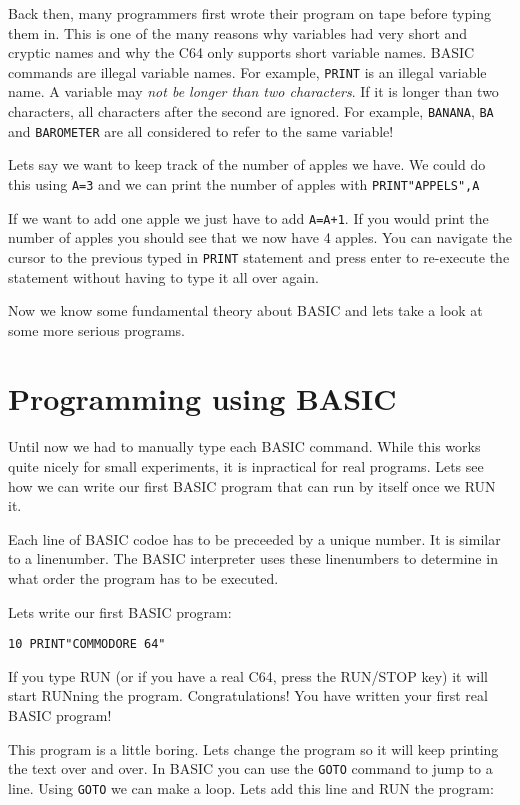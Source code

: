 \documentclass{article}
\begin{document}
Back then, many programmers first wrote their program on tape before typing them in.
This is one of the many reasons why variables had very short and cryptic names and why the C64 only supports short variable names.
BASIC commands are illegal variable names. For example, \verb:PRINT: is an illegal variable name.
A variable may \emph{not be longer than two characters}.
If it is longer than two characters, all characters after the second are ignored.
For example, \verb:BANANA:, \verb:BA: and \verb:BAROMETER: are all considered to refer to the same variable!

Lets say we want to keep track of the number of apples we have.
We could do this using \verb:A=3: and we can print the number of apples with \verb:PRINT"APPELS",A:

If we want to add one apple we just have to add \verb:A=A+1:.
If you would print the number of apples you should see that we now have 4 apples.
You can navigate the cursor to the previous typed in \verb:PRINT: statement and press enter to re-execute the statement without having to type it all over again.

Now we know some fundamental theory about BASIC and lets take a look at some more serious programs.

\section{Programming using BASIC}

Until now we had to manually type each BASIC command.
While this works quite nicely for small experiments, it is inpractical for real programs.
Lets see how we can write our first BASIC program that can run by itself once we RUN it.

Each line of BASIC codoe has to be preceeded by a unique number.
It is similar to a linenumber.
The BASIC interpreter uses these linenumbers to determine in what order the program has to be executed.

Lets write our first BASIC program:

\begin{lstlisting}
10 PRINT"COMMODORE 64"
\end{lstlisting}

If you type RUN (or if you have a real C64, press the RUN/STOP key) it will start RUNning the program.
Congratulations! You have written your first real BASIC program!

This program is a little boring.
Lets change the program so it will keep printing the text over and over.
In BASIC you can use the \verb:GOTO: command to jump to a line.
Using \verb:GOTO: we can make a loop.
Lets add this line and RUN the program:
\end{document}
